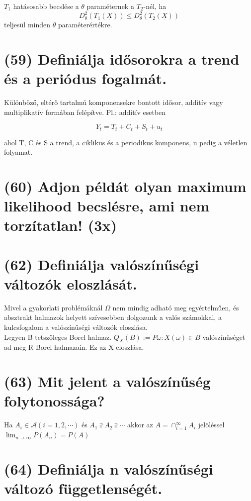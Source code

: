 \documentclass[12p]{article}
\begin{document}
$T_1$ hatásosabb becslése a $\theta$ paraméternek a $T_2$-nél, ha
$$D_{\theta}^2(T_1(\underline{X})) \leq D_{\theta}^2(T_2(\underline{X}))$$
teljesül minden $\theta$ paraméterértékre.

\section{(59) Definiálja idősorokra a trend és a periódus fogalmát.}

Különböző, eltérő tartalmú
komponensekre bontott idősor, additív vagy multiplikatív
formában felépítve. Pl.: additív esetben

$$Y_t = T_t + C_t + S_t + u_t$$

ahol T, C és S a trend, a ciklikus és a periodikus komponens,
u pedig a véletlen folyamat.

\section{(60) Adjon példát olyan maximum likelihood becslésre, ami nem torzítatlan! (3x)}



\section{(62) Definiálja valószínűségi változók eloszlását.}

Mivel a gyakorlati problémáknál $\Omega$ nem
mindig adható meg egyértelműen, és
absztrakt halmazok helyett szívesebben
dolgozunk a valós számokkal, a kulcsfogalom
a valószínűségi változók eloszlása.\\
Legyen B tetszőleges Borel halmaz.
$Q_X(B):= P{\omega: X(\omega) \in B}$ valószínűséget ad
meg R Borel halmazain. Ez az X eloszlása.\\

\section{(63) Mit jelent a valószínűség folytonossága?}

Ha $A_i \in \mathcal{A} (i = 1,2,\cdots)$ és $A_1 \supseteqq A_2 \supseteqq \cdots$ akkor az $\displaystyle{A = \cap^{\infty}_{i=1}A_i}$ jelöléssel $\lim_{n \rightarrow \infty} P(A_n)=P(A)$

\section{(64) Definiálja n valószínűségi változó függetlenségét.}
\end{document}
